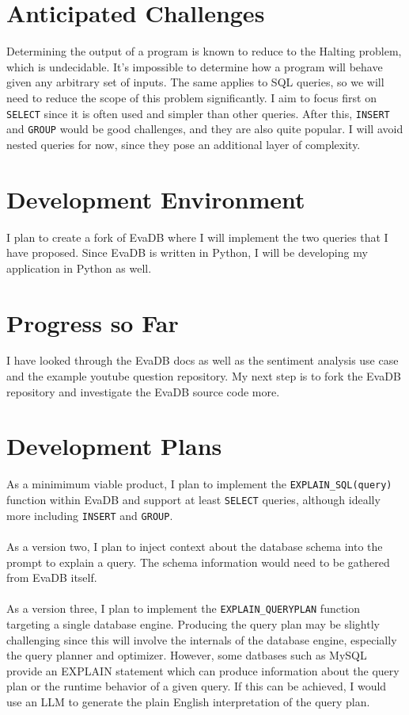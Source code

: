\documentclass{article}
\begin{document}
\section{Anticipated Challenges}
Determining the output of a program is known to reduce to the Halting problem, which is undecidable. It's impossible to determine how a program will behave given any arbitrary set of inputs. The same applies to SQL queries, so we will need to reduce the scope of this problem significantly. I aim to focus first on \texttt{SELECT} since it is often used and simpler than other queries. After this, \texttt{INSERT} and \texttt{GROUP} would be good challenges, and they are also quite popular. I will avoid nested queries for now, since they pose an additional layer of complexity. 

\section{Development Environment}
I plan to create a fork of EvaDB where I will implement the two queries that I have proposed. Since EvaDB is written in Python, I will be developing my application in Python as well. 

\section{Progress so Far}
I have looked through the EvaDB docs as well as the sentiment analysis use case and the example youtube question repository. My next step is to fork the EvaDB repository and investigate the EvaDB source code more.

\section{Development Plans}

As a minimimum viable product, I plan to implement the \texttt{EXPLAIN_SQL(query)} function within EvaDB and support at least \texttt{SELECT} queries, although ideally more including \texttt{INSERT} and \texttt{GROUP}.
\\ \\
As a version two, I plan to inject context about the database schema into the prompt to explain a query. The schema information would need to be gathered from EvaDB itself.
\\ \\
As a version three, I plan to implement the \texttt{EXPLAIN_QUERYPLAN} function targeting a single database engine. Producing the query plan may be slightly challenging since this will involve the internals of the database engine, especially the query planner and optimizer. However, some datbases such as MySQL provide an EXPLAIN statement which can produce information about the query plan or the runtime behavior of a given query. If this can be achieved, I would use an LLM to generate the plain English interpretation of the query plan.
\end{document}
